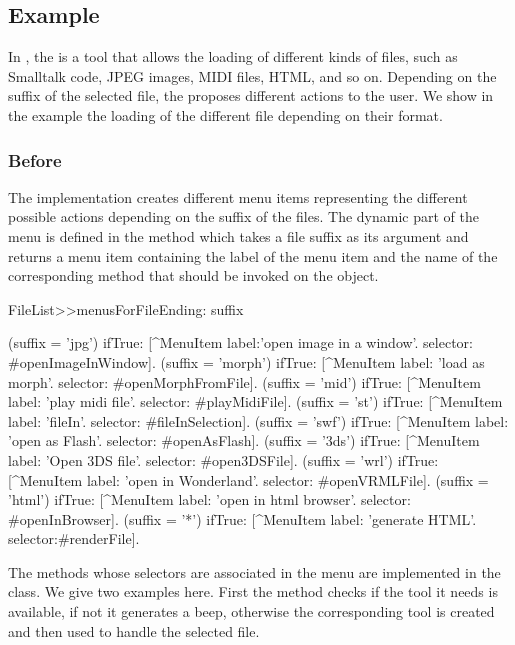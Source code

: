 \documentclass[a4paper,10pt,twoside]{book}
\begin{document}
\subsection*{Example}

In  \cite{Inga97a}, the  is a tool that allows the loading of different kinds of files, such as Smalltalk code, JPEG images, MIDI files, HTML, and so on. Depending on the suffix of the selected file, the  proposes different actions to the user. We show in the example the loading of the different file depending on their format. 

\subsubsection*{Before}

The  implementation creates different menu items representing the different possible actions depending on the suffix of the files. The dynamic part of the menu is defined in the method  which takes a file suffix as its argument and returns a menu item containing the label of the menu item and the name of the corresponding method that should be invoked on the  object.

\begin{code}
FileList>>menusForFileEnding: suffix

	(suffix = 'jpg') ifTrue:
		[^MenuItem label:'open image in a window'.
			selector: #openImageInWindow].
	(suffix = 'morph') ifTrue:
		[^MenuItem label: 'load as morph'.
			selector: #openMorphFromFile].
	(suffix = 'mid') ifTrue:
		[^MenuItem label: 'play midi file'.
			selector: #playMidiFile].
	(suffix = 'st') ifTrue:
		[^MenuItem label: 'fileIn'.
			selector: #fileInSelection].
	(suffix = 'swf') ifTrue:
		[^MenuItem label: 'open as Flash'.
			selector: #openAsFlash].
	(suffix = '3ds') ifTrue:
		[^MenuItem label: 'Open 3DS file'.
			selector: #open3DSFile].
	(suffix = 'wrl') ifTrue:
		[^MenuItem label: 'open in Wonderland'.
			selector: #openVRMLFile].
	(suffix = 'html') ifTrue:
		[^MenuItem label: 'open in html browser'.
			selector: #openInBrowser].
	(suffix = '*') ifTrue:
		[^MenuItem label: 'generate HTML'.
			selector:#renderFile].
\end{code}

The methods whose selectors are associated in the menu are implemented in the  class. We give two examples here. First the method checks if the tool it needs is available, if not it generates a beep, otherwise the corresponding tool is created and then used to handle the selected file.
\end{document}
